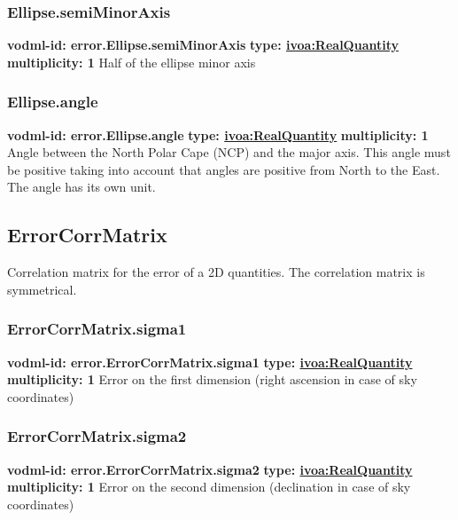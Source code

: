     \subsubsection{Ellipse.semiMinorAxis}
      \textbf{vodml-id: error.Ellipse.semiMinorAxis} \newline
      \textbf{type: \hyperref[sect:ivoa]{ivoa:RealQuantity}} \newline
      \textbf{multiplicity: 1} \newline
      Half of the ellipse minor axis

    \subsubsection{Ellipse.angle}
      \textbf{vodml-id: error.Ellipse.angle} \newline
      \textbf{type: \hyperref[sect:ivoa]{ivoa:RealQuantity}} \newline
      \textbf{multiplicity: 1} \newline
      Angle between the North Polar Cape (NCP) and the major axis. This angle must be positive taking into account that angles are positive from North to the East. The angle has its own unit.

  \subsection{ErrorCorrMatrix}
  \label{sect:error.ErrorCorrMatrix}
    Correlation matrix for the error of a 2D quantities. The correlation matrix is symmetrical.

    \subsubsection{ErrorCorrMatrix.sigma1}
      \textbf{vodml-id: error.ErrorCorrMatrix.sigma1} \newline
      \textbf{type: \hyperref[sect:ivoa]{ivoa:RealQuantity}} \newline
      \textbf{multiplicity: 1} \newline
      Error on the first dimension (right ascension in case of sky coordinates)

    \subsubsection{ErrorCorrMatrix.sigma2}
      \textbf{vodml-id: error.ErrorCorrMatrix.sigma2} \newline
      \textbf{type: \hyperref[sect:ivoa]{ivoa:RealQuantity}} \newline
      \textbf{multiplicity: 1} \newline
      Error on the second dimension (declination in case of sky coordinates)

